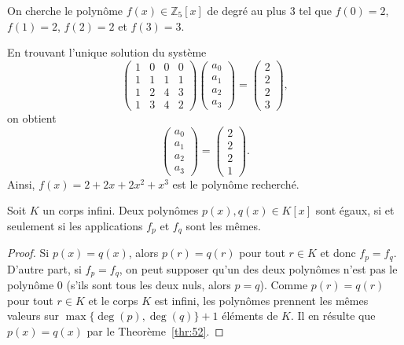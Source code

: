 \begin{example}
  \label{exe:38}
  On cherche le polynôme $f(x) ∈ ℤ_5[x]$ de degré au plus $3$ tel que
  $f(0) = 2$, $f(1)=2$, $f(2) = 2$ et $f(3) = 3$.

  En trouvant l'unique solution du système
  \begin{displaymath}
    \left(\begin{array}{rrrr}
1 & 0 & 0 & 0 \\
1 & 1 & 1 & 1 \\
1 & 2 & 4 & 3 \\
1 & 3 & 4 & 2
\end{array}\right)
\begin{pmatrix}
  a_0 \\ a_1 \\ a_2 \\ a_3
\end{pmatrix}
=
\begin{pmatrix}
  2 \\ 2 \\ 2 \\3
\end{pmatrix},
\end{displaymath}on obtient
\begin{displaymath}
  \begin{pmatrix}
  a_0 \\ a_1 \\ a_2 \\ a_3
\end{pmatrix} =
\begin{pmatrix}
  2 \\ 2 \\ 2 \\ 1
\end{pmatrix}.
\end{displaymath}
Ainsi, $f(x) = 2 + 2x + 2x^2 + x^3$ est le polynôme recherché. 

\end{example}


\begin{corollary}
  \label{thr:42}
  Soit $K$ un corps infini. Deux polynômes $p(x),q(x) ∈ K[x]$ sont égaux, si et seulement si les applications $f_p$ et $f_q$ sont les mêmes.
\end{corollary}
\begin{proof}
  Si $p(x) = q(x)$, alors $p(r) = q(r)$ pour tout $r ∈K$ et donc $f_p = f_q$. D'autre part, si $f_p = f_q$, on peut supposer qu'un des deux polynômes n'est pas le polynôme $0$ (s'ils sont tous les deux nuls, alors $p=q$).  Comme $p(r) = q(r)$ pour tout $r ∈K$ et le corps $K$ est infini, les polynômes prennent les mêmes valeurs sur $\max\{\deg(p),\deg(q)\}+1$ éléments de $K$. Il en résulte que $p(x) = q(x)$ par le Theorème~\ref{thr:52}. 
\end{proof}


